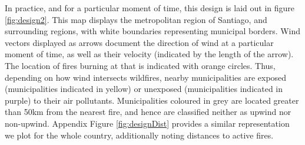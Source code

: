 \documentclass[11pt]{article}
\begin{document}
\begin{spacing}{1.5}
In practice, and for a particular moment of time, this design is laid out in figure \ref{fig:design2}.  This map displays the metropolitan region of Santiago, and surrounding regions, with white boundaries representing municipal borders.  Wind vectors displayed as arrows document the direction of wind at a particular moment of time, as well as their velocity (indicated by the length of the arrow).  The location of fires burning at that is indicated with orange circles. Thus, depending on how wind intersects wildfires, nearby municipalities are exposed (municipalities indicated in yellow) or unexposed (municipalities indicated in purple) to their air pollutants. Municipalities coloured in grey are located greater than 50km from the nearest fire, and hence are classified neither as upwind nor non-upwind. Appendix Figure \ref{fig:designDist} provides a similar representation we plot for the whole country, additionally noting distances to active fires.



\end{spacing}
\end{document}
